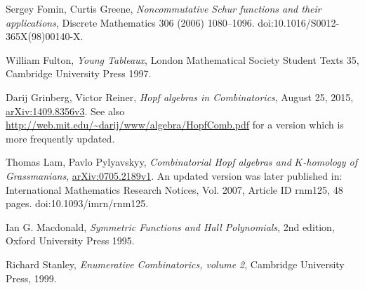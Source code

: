 \documentclass[numbers=enddot,12pt,final,onecolumn,notitlepage]{scrartcl}%
\theoremstyle{definition}
\begin{document}
\begin{thebibliography}{99999999}                                                                                         %


%

Sergey Fomin, Curtis Greene, \textit{Noncommutative
Schur functions and their applications}, Discrete Mathematics 306 (2006) 1080--1096.
doi:10.1016/S0012-365X(98)00140-X.

William Fulton, \textit{Young Tableaux}, London
Mathematical Society Student Texts 35, Cambridge University Press 1997.

Darij Grinberg, Victor Reiner, \textit{Hopf
algebras in Combinatorics}, August 25, 2015,
\href{http://arxiv.org/abs/1409.8356v3}{arXiv:1409.8356v3}. \newline See also
\url{http://web.mit.edu/~darij/www/algebra/HopfComb.pdf} for a version which
is more frequently updated.

Thomas Lam, Pavlo Pylyavskyy, \textit{Combinatorial
Hopf algebras and }$K$\textit{-homology of Grassmanians},
\href{http://arxiv.org/abs/0705.2189v1}{arXiv:0705.2189v1}. An updated version
was later published in: International Mathematics Research Notices, Vol. 2007,
Article ID rnm125, 48 pages. doi:10.1093/imrn/rnm125.

Ian G. Macdonald, \textit{Symmetric Functions and
Hall Polynomials}, 2nd edition, Oxford University Press 1995.

Richard Stanley, \textit{Enumerative Combinatorics,
volume 2}, Cambridge University Press, 1999.
\end{thebibliography}
\end{document}
